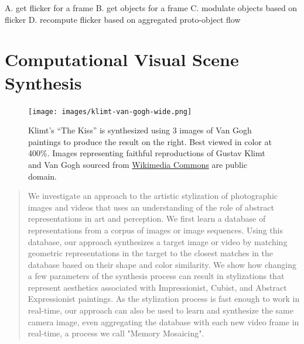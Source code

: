 \documentclass[a4paper,10pt,final]{ThesisStyle}
\begin{document}
A. get flicker for a frame
B. get objects for a frame
C. modulate objects based on flicker
D. recompute flicker based on aggregated proto-object flow






\chapter{Computational Visual Scene Synthesis}
\label{ch:synthesis-visual}
\minitoc

\begin{figure}[ht]
 \texttt{[image: images/klimt-van-gogh-wide.png]}
 \caption{Klimt's ``The Kiss'' is synthesized using 3 images of Van Gogh paintings to produce the result on the right.  Best viewed in color at 400\%.  Images representing faithful reproductions of Gustav Klimt and Van Gogh sourced from \href{http://commons.wikimedia.org}{Wikimedia Commons} are public domain.}
 \label{fig:teaser}
\end{figure}

\begin{abstract}
We investigate an approach to the artistic stylization of photographic images and videos that uses an understanding of the role of abstract representations in art and perception.  We first learn a database of representations from a corpus of images or image sequences.  Using this database, our approach synthesizes a target image or video by matching geometric representations in the target to the closest matches in the database based on their shape and color similarity.  We show how changing a few parameters of the synthesis process can result in stylizations that represent aesthetics associated with Impressionist, Cubist, and Abstract Expressionist paintings.  As the stylization process is fast enough to work in real-time, our approach can also be used to learn and synthesize the same camera image, even aggregating the database with each new video frame in real-time, a process we call "Memory Mosaicing". 

\end{abstract}
\end{document}
